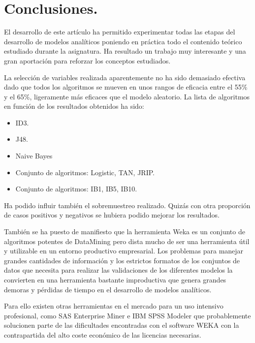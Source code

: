 \section{Conclusiones.}

El desarrollo de este artículo ha permitido experimentar todas las etapas del desarrollo de modelos analíticos poniendo en práctica todo el contenido teórico estudiado durante la asignatura. Ha resultado un trabajo muy interesante y una gran aportación para reforzar los conceptos estudiados. 

La selección de variables realizada aparentemente no ha sido demasiado efectiva dado que todos los algoritmos se mueven en unos rangos de eficacia entre el 55\% y el 65\%, ligeramente más eficaces que el modelo aleatorio. La lista de algoritmos en función de los resultados obtenidos ha sido:

\begin{itemize}

\item{ID3.}
\item{J48.}
\item{Naive Bayes}
\item{Conjunto de algoritmos: Logistic, TAN, JRIP.}
\item{Conjunto de algoritmos: IB1, IB5, IB10.}

\end{itemize}

Ha podido influir también el sobremuestreo realizado. Quizás con otra proporción de casos positivos y negativos se hubiera podido mejorar los resultados.

También se ha puesto de manifiesto que la herramienta Weka es un conjunto de algoritmos potentes de DataMining pero dista mucho de ser una herramienta útil y utilizable en un entorno productivo empresarial. Los problemas para manejar grandes cantidades de información y los estrictos formatos de los conjuntos de datos que necesita para realizar las validaciones de los diferentes modelos la convierten en una herramienta bastante improductiva que genera grandes demoras y pérdidas de tiempo en el desarrollo de modelos analíticos.

Para ello existen otras herramientas en el mercado para un uso intensivo profesional, como SAS Enterprise Miner e IBM SPSS Modeler que probablemente solucionen parte de las dificultades encontradas con el software WEKA con la contrapartida del alto coste económico de las licencias necesarias.